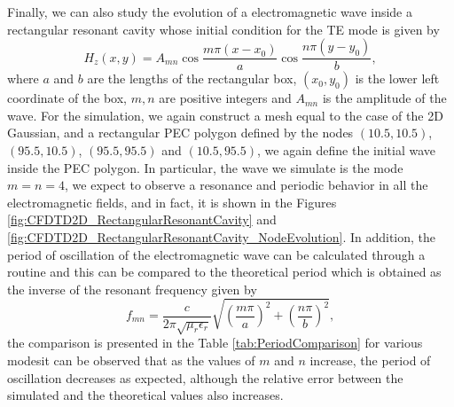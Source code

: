 \documentclass[12pt, oneside]{book}
\begin{document}
Finally, we can also study the evolution of a electromagnetic wave inside a rectangular resonant cavity whose initial condition for the TE mode is given by \cite{pozar2012microwave}
\begin{equation}
    H_z(x, y) = A_{mn}\cos\dfrac{m \pi (x-x_0)}{a} \cos\dfrac{n \pi (y-y_0)}{b},
\label{eq:ResonantRectangularCavity}
\end{equation}
where $a$ and $b$ are the lengths of the rectangular box, $(x_0, y_0)$ is the lower left coordinate of the box, $m, n$ are positive integers and $A_{mn}$ is the amplitude of the wave. For the simulation, we again construct a mesh equal to the case of the 2D Gaussian, and a rectangular PEC polygon defined by the nodes $(10.5,10.5)$, $(95.5,10.5)$, $(95.5, 95.5)$ and $(10.5, 95.5)$, we again define the initial wave inside the PEC polygon. In particular, the wave we simulate is the mode $m = n = 4$, we expect to observe a resonance and periodic behavior in all the electromagnetic fields, and in fact, it is shown in the Figures \ref{fig:CFDTD2D_RectangularResonantCavity} and \ref{fig:CFDTD2D_RectangularResonantCavity_NodeEvolution}. In addition, the period of oscillation of the electromagnetic wave can be calculated through a routine and this can be compared to the theoretical period which is obtained as the inverse of the resonant frequency given by \cite{pozar2012microwave}
\begin{equation}
    f_{mn} = \dfrac{c}{2 \pi \sqrt{\mu_r \epsilon_r}} \sqrt{ \left( \dfrac{m\pi}{a} \right)^2 + \left( \dfrac{n\pi}{b} \right)^2},
\end{equation}
the comparison is presented in the Table \ref{tab:PeriodComparison} for various modesit can be observed that as the values of $m$ and $n$ increase, the period of oscillation decreases as expected, although the relative error between the simulated and the theoretical values also increases.
\end{document}
